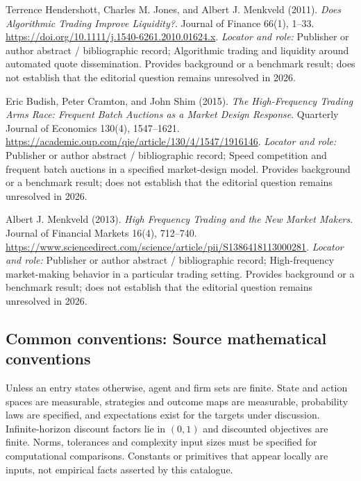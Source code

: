 \documentclass[11pt,a4paper]{article}
\begin{document}
\begin{enumerate}[label={[S\arabic*]},leftmargin=*]

\item Terrence Hendershott, Charles M. Jones, and Albert J. Menkveld (2011). \emph{Does Algorithmic Trading Improve Liquidity?}. Journal of Finance 66(1), 1–33. \url{https://doi.org/10.1111/j.1540-6261.2010.01624.x}.
\textit{Locator and role:} Publisher or author abstract / bibliographic record; Algorithmic trading and liquidity around automated quote dissemination. Provides background or a benchmark result; does not establish that the editorial question remains unresolved in 2026.

\item Eric Budish, Peter Cramton, and John Shim (2015). \emph{The High-Frequency Trading Arms Race: Frequent Batch Auctions as a Market Design Response}. Quarterly Journal of Economics 130(4), 1547–1621. \url{https://academic.oup.com/qje/article/130/4/1547/1916146}.
\textit{Locator and role:} Publisher or author abstract / bibliographic record; Speed competition and frequent batch auctions in a specified market-design model. Provides background or a benchmark result; does not establish that the editorial question remains unresolved in 2026.

\item Albert J. Menkveld (2013). \emph{High Frequency Trading and the New Market Makers}. Journal of Financial Markets 16(4), 712–740. \url{https://www.sciencedirect.com/science/article/pii/S1386418113000281}.
\textit{Locator and role:} Publisher or author abstract / bibliographic record; High-frequency market-making behavior in a particular trading setting. Provides background or a benchmark result; does not establish that the editorial question remains unresolved in 2026.

\end{enumerate}

\subsection*{Common conventions: Source mathematical conventions}

Unless an entry states otherwise, agent and firm sets are finite. State and action spaces are measurable, strategies and outcome maps are measurable, probability laws are specified, and expectations exist for the targets under discussion. Infinite-horizon discount factors lie in $(0,1)$ and discounted objectives are finite. Norms, tolerances and complexity input sizes must be specified for computational comparisons. Constants or primitives that appear locally are inputs, not empirical facts asserted by this catalogue.
\end{document}
